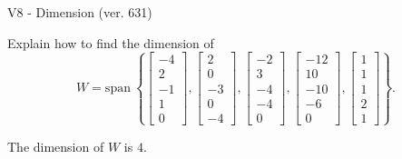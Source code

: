 \begin{exercise}
  \begin{exerciseTitle}V8 - Dimension (ver. 631)\end{exerciseTitle}
  \begin{exerciseStatement}
    Explain how to find the dimension of 
\[W=\mathrm{span}\ \left\{\left[\begin{array}{r}
-4 \\
2 \\
-1 \\
1 \\
0
\end{array}\right] , \left[\begin{array}{r}
2 \\
0 \\
-3 \\
0 \\
-4
\end{array}\right] , \left[\begin{array}{r}
-2 \\
3 \\
-4 \\
-4 \\
0
\end{array}\right] , \left[\begin{array}{r}
-12 \\
10 \\
-10 \\
-6 \\
0
\end{array}\right] , \left[\begin{array}{r}
1 \\
1 \\
1 \\
2 \\
1
\end{array}\right]\right\}.\]



  \end{exerciseStatement}
  \begin{exerciseAnswer}
   The dimension of \(W\) is  \(4\).
  


  \end{exerciseAnswer}
\end{exercise}